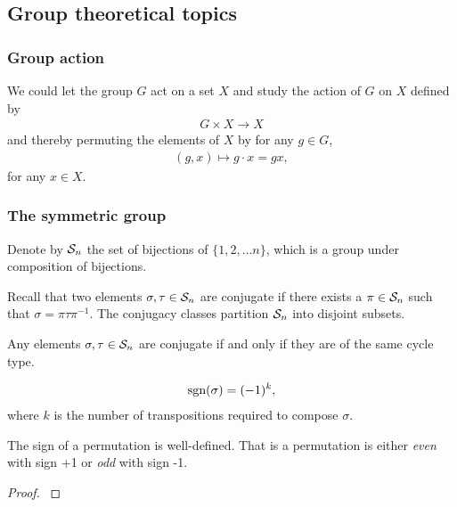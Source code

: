 \subsection{Group theoretical topics}

	\subsubsection{Group action}
	
		We could let the group $G$ act on a set $X$ and study the action of $G$ on $X$ defined by
		\begin{align*}
			G \times X \rightarrow X
		\end{align*}
		and thereby permuting the elements of $X$ by for any $g \in G$,
		\begin{align*}
			(g,x) \mapsto g \cdot x = gx,
		\end{align*}
		for any $x \in X$.
	
	\subsubsection{The symmetric group}
	
		Denote by $\mathcal{S}_n$ the set of bijections of $\{1, 2, \dots n\}$, which is a group under composition of bijections.
	
		Recall that two elements $\sigma, \tau \in \mathcal{S}_n$ are conjugate if there exists a $\pi \in \mathcal{S}_n$ such that $\sigma = \pi \tau \pi^{-1}$. The conjugacy classes partition $\mathcal{S}_n$ into disjoint subsets. 
		
		\begin{proposition}
			Any elements $\sigma, \tau \in \mathcal{S}_n$ are conjugate if and only if they are of the same cycle type.
		\end{proposition}
		
		\begin{definition}
			\begin{align*}
				\text{sgn}(\sigma) = (-1)^k,
			\end{align*}
			where $k$ is the number of transpositions required to compose $\sigma$.
		\end{definition}
		
		\begin{proposition}\label{prop:signwelldefined}
			The sign of a permutation is well-defined. That is a permutation is either \textit{even} with sign +1 or \textit{odd} with sign -1.
		\end{proposition}
		\begin{proof}
			\cite[Thm.12.6.1.]{Biggs}
		\end{proof}
		
		
		